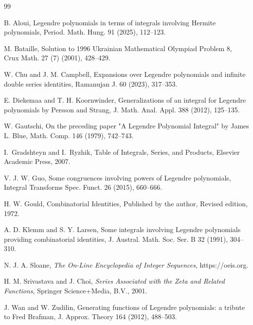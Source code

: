 \documentclass[11pt,reqno]{amsart}
\theoremstyle{plain}
\numberwithin{equation}{section}
\begin{document}

\begin{thebibliography}{99}

B. Aloui, Legendre polynomials in terms of integrals involving Hermite polynomials, Period. Math. Hung. 91 (2025), 112--123.

M. Bataille, Solution to 1996 Ukrainian Mathematical Olympiad Problem 8, Crux Math. 27 (7) (2001), 428--429.

W. Chu and J. M. Campbell, Expansions over Legendre polynomials and infinite double series identities, Ramanujan J. 60 (2023), 317--353.

E. Diekemaa and T. H. Koornwinder, Generalizations of an integral for Legendre polynomials by Persson and Strang,
J. Math. Anal. Appl. 388 (2012), 125--135.

W. Gautschi, On the preceding paper "A Legendre Polynomial Integral" by James L. Blue, Math. Comp. 146 (1979), 742--743.

I.~Gradshteyn and I.~Ryzhik, Table of Integrals, Series, and Products, Elsevier Academic Press, 2007.

V. J. W. Guo, Some congruences involving powers of Legendre polynomials, Integral Transforms Spec. Funct. 26 (2015), 660--666.

H. W. Gould, Combinatorial Identities, Published by the author, Revised edition, 1972.

A. D. Klemm and S. Y. Larsen, Some integrals involving Legendre polynomials providing combinatorial identities, 
J. Austral. Math. Soc. Ser. B 32 (1991), 304--310.

N. J. A. Sloane, \emph{The On-Line Encyclopedia of Integer Sequences}, https://oeis.org.

H. M. Srivastava and J. Choi, \emph{Series Associated with the Zeta and Related Functions}, Springer Science+Media, B.V., 2001.

J. Wan and W. Zudilin, Generating functions of Legendre polynomials: a tribute to Fred Brafman, J. Approx. Theory 164 (2012), 488--503.

\end{thebibliography}
\end{document}
